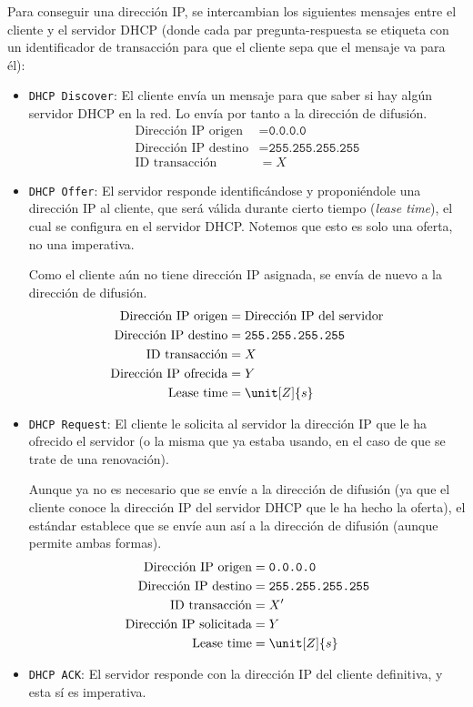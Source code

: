 Para conseguir una dirección IP, se intercambian los siguientes mensajes entre el cliente y el servidor \acrshort{DHCP} (donde cada par pregunta-respuesta se etiqueta con un identificador de transacción para que el cliente sepa que el mensaje va para él):
\begin{itemize}
    \item \verb|DHCP Discover|: El cliente envía un mensaje para que saber si hay algún servidor \acrshort{DHCP} en la red. Lo envía por tanto a la dirección de difusión.
    \begin{align*}
        \text{Dirección IP origen} &= \texttt{0.0.0.0} \\
        \text{Dirección IP destino} &= \texttt{255.255.255.255} \\
        \text{ID transacción} &= X
    \end{align*}

    \item \verb|DHCP Offer|: El servidor responde identificándose y proponiéndole una dirección IP al cliente, que será válida durante cierto tiempo (\textit{lease time}), el cual se configura en el servidor \acrshort{DHCP}. Notemos que esto es solo una oferta, no una imperativa.
    
    Como el cliente aún no tiene dirección IP asignada, se envía de nuevo a la dirección de difusión.
    \begin{align*}
        \text{Dirección IP origen} &= \text{Dirección IP del servidor} \\
        \text{Dirección IP destino} &= \texttt{255.255.255.255} \\
        \text{ID transacción} &= X \\
        \text{Dirección IP ofrecida} &= Y \\
        \text{Lease time} &= \unit[Z]{s}
    \end{align*}
    \item \verb|DHCP Request|: El cliente le solicita al servidor la dirección IP que le ha ofrecido el servidor (o la misma que ya estaba usando, en el caso de que se trate de una renovación).
    
    Aunque ya no es necesario que se envíe a la dirección de difusión (ya que el cliente conoce la dirección IP del servidor \acrshort{DHCP} que le ha hecho la oferta), el estándar establece que se envíe aun así a la dirección de difusión (aunque permite ambas formas).
    \begin{align*}
        \text{Dirección IP origen} &= \texttt{0.0.0.0} \\
        \text{Dirección IP destino} &= \texttt{255.255.255.255} \\
        \text{ID transacción} &= X' \\
        \text{Dirección IP solicitada} &= Y \\
        \text{Lease time} &= \unit[Z]{s}
    \end{align*}
    \item \verb|DHCP ACK|: El servidor responde con la dirección IP del cliente definitiva, y esta sí es imperativa.
    

\end{itemize}
